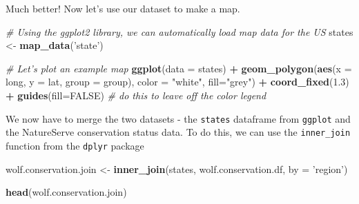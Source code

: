 \documentclass[]{article}
\newenvironment{Shaded}{\begin{snugshade}}{\end{snugshade}}
\newcommand{\CommentTok}[1]{\textcolor[rgb]{0.56,0.35,0.01}{\textit{#1}}}
\newcommand{\DataTypeTok}[1]{\textcolor[rgb]{0.13,0.29,0.53}{#1}}
\newcommand{\DecValTok}[1]{\textcolor[rgb]{0.00,0.00,0.81}{#1}}
\newcommand{\FloatTok}[1]{\textcolor[rgb]{0.00,0.00,0.81}{#1}}
\newcommand{\KeywordTok}[1]{\textcolor[rgb]{0.13,0.29,0.53}{\textbf{#1}}}
\newcommand{\NormalTok}[1]{#1}
\newcommand{\OperatorTok}[1]{\textcolor[rgb]{0.81,0.36,0.00}{\textbf{#1}}}
\newcommand{\OtherTok}[1]{\textcolor[rgb]{0.56,0.35,0.01}{#1}}
\newcommand{\StringTok}[1]{\textcolor[rgb]{0.31,0.60,0.02}{#1}}
\begin{document}
\begin{Shaded}
\end{Shaded}

Much better! Now let's use our dataset to make a map.

\begin{Shaded}
\begin{Highlighting}[]
\CommentTok{# Using the ggplot2 library, we can automatically load map data for the US}
\NormalTok{states <-}\StringTok{ }\KeywordTok{map_data}\NormalTok{(}\StringTok{'state'}\NormalTok{)}


\CommentTok{# Let's plot an example map}
\KeywordTok{ggplot}\NormalTok{(}\DataTypeTok{data =}\NormalTok{ states) }\OperatorTok{+}\StringTok{ }
\StringTok{  }\KeywordTok{geom_polygon}\NormalTok{(}\KeywordTok{aes}\NormalTok{(}\DataTypeTok{x =}\NormalTok{ long, }\DataTypeTok{y =}\NormalTok{ lat, }\DataTypeTok{group =}\NormalTok{ group), }\DataTypeTok{color =} \StringTok{"white"}\NormalTok{, }\DataTypeTok{fill=}\StringTok{"grey"}\NormalTok{) }\OperatorTok{+}\StringTok{ }
\StringTok{  }\KeywordTok{coord_fixed}\NormalTok{(}\FloatTok{1.3}\NormalTok{) }\OperatorTok{+}
\StringTok{  }\KeywordTok{guides}\NormalTok{(}\DataTypeTok{fill=}\OtherTok{FALSE}\NormalTok{)  }\CommentTok{# do this to leave off the color legend }
\end{Highlighting}
\end{Shaded}

We now have to merge the two datasets - the \texttt{states} dataframe
from \texttt{ggplot} and the NatureServe conservation status data. To do
this, we can use the \texttt{inner\_join} function from the
\texttt{dplyr} package

\begin{Shaded}
\begin{Highlighting}[]
\NormalTok{wolf.conservation.join <-}\StringTok{ }\KeywordTok{inner_join}\NormalTok{(states, wolf.conservation.df, }\DataTypeTok{by =} \StringTok{'region'}\NormalTok{)}

\KeywordTok{head}\NormalTok{(wolf.conservation.join)}
\end{Highlighting}
\end{Shaded}
\end{document}
